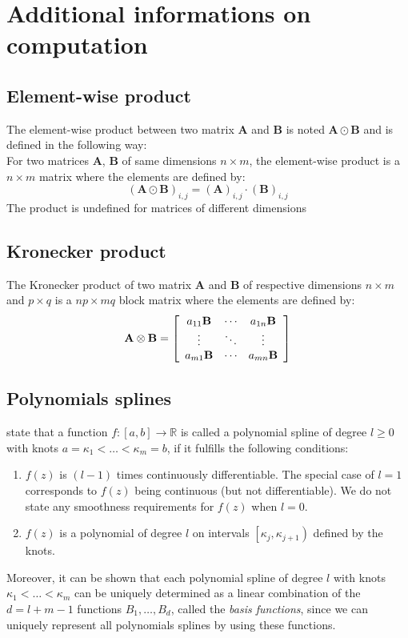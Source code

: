 \chapter{Additional informations on computation}
\label{appendix:add_info}
\section{Element-wise product}
The element-wise product between two matrix $\mathbf{A}$ and $\mathbf{B}$ is noted $\mathbf{A} \odot \mathbf{B}$ and is defined in the following way:\\
For two matrices $\mathbf{A}$, $\mathbf{B}$ of same dimensions $n \times m$, the element-wise product is a $n \times m$ matrix where the elements are defined by:
\[(\mathbf{A} \odot \mathbf{B})_{i,j} = (\mathbf{A})_{i,j} \cdot (\mathbf{B})_{i,j}\]
The product is undefined for matrices of different dimensions

\section{Kronecker product}
The Kronecker product of two matrix $\mathbf{A}$ and $\mathbf{B}$ of respective dimensions $n \times m$ and $p \times q$ is a $np \times mq$ block matrix where the elements are defined by:
\[\mathbf { A } \otimes \mathbf { B } = 
\left[ 
\begin{array}
 { c c c } { a _ { 11 } \mathbf { B } } & { \cdots } & { a _ { 1 n } \mathbf { B } } \\ { \vdots } & { \ddots } & { \vdots } \\ { a _ { m 1 } \mathbf { B } } & { \cdots } & { a _ { m n } \mathbf { B } } 
\end{array} 
\right]\] 

\section{Polynomials splines}
\label{appendix:polynomial_splines}
\textcite{fahrmeir_regression:_2013} state that a function $f : [ a , b ] \rightarrow \mathbb { R }$ is called a polynomial spline of degree $l \geq 0$ with knots $a = \kappa _ { 1 } < \ldots < \kappa _ { m } = b$, if it fulfills the following conditions:
\begin{enumerate}
\item $f(z)$ is $(l-1)$ times continuously differentiable. The special case of $l = 1$ corresponds to $f(z)$ being continuous (but not differentiable). We do not state any smoothness requirements for $f(z)$ when $l=0$.
\item $f(z)$ is a polynomial of degree $l$ on intervals $\left[ \kappa _ { j } , \kappa _ { j + 1 } \right)$ defined by the knots.
\end{enumerate}
Moreover, it can be shown that each polynomial spline of degree $l$ with
knots $\kappa _ { 1 } < \ldots < \kappa _ { m }$ can be uniquely determined as a linear combination of the $d = l+m-1$ functions
$B_1, \dots , B_d$, called the \textit{basis functions}, since we can uniquely represent all polynomials splines by using these functions.

